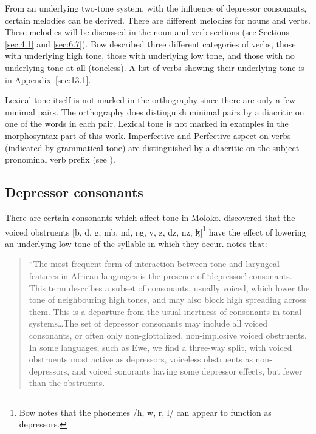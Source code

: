 From an underlying two-tone system, with the influence of depressor consonants, certain melodies can be derived.  There are different melodies for nouns and verbs. These melodies will be discussed in the noun and verb sections (see Sections \ref{sec:4.1} and \ref{sec:6.7}). Bow described three different categories of verbs, those with underlying high tone, those with underlying low tone, and those with no underlying tone at all (toneless). A list of verbs showing their underlying tone is in Appendix~\ref{sec:13.1}.

Lexical tone itself is not marked in the orthography since there are only a few minimal pairs. The orthography does distinguish minimal pairs by a diacritic on one of the words in each pair. Lexical tone is not marked in examples in the morphosyntax part of this work. Imperfective and Perfective aspect on verbs (indicated by grammatical tone) are distinguished by a diacritic on the subject pronominal verb prefix (see ). 

\subsection{Depressor consonants}\label{sec:2.4.1}
\hypertarget{RefHeading1210641525720847}{}
There are certain consonants which affect tone in Moloko.  \citet{Bow1997c} discovered that the voiced obstruents [b, d, g, mb, nd, ŋg, v, z, dz, nz, ɮ]\footnote{Bow notes that the phonemes /h, w, r, l/ can appear to function as depressors.} have the effect of lowering an underlying low tone of the syllable in which they occur. \cite[113, 158]{Yip2002} notes that: 

\begin{quote}
“The most frequent form of interaction between tone and laryngeal features in African languages is the presence of ‘depressor' consonants. This term describes a subset of consonants, usually voiced, which lower the tone of neighbouring high tones, and may also block high spreading across them. This is a departure from the usual inertness of consonants in tonal systems…The set of depressor consonants may include all voiced consonants, or often only non-glottalized, non-implosive voiced obstruents. In some languages, such as Ewe, we find a three-way split, with voiced obstruents most active as depressors, voiceless obstruents as non-depressors, and voiced sonorants having some depressor effects, but fewer than the obstruents.{\textquotedbl}
\end{quote}

